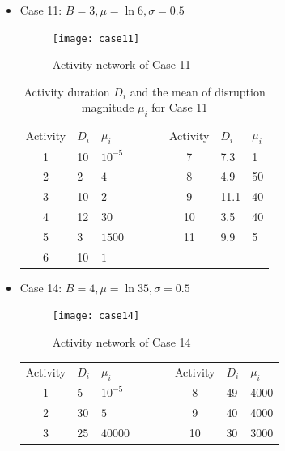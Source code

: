 \documentclass[11pt]{article}
\begin{document}
    \begin{itemize}
        \item Case 11: \(B = 3, \mu = \ln 6, \sigma = 0.5\)
            \begin{figure}[H]
    		    \centering
    		    \texttt{[image: case11]}
    		    \caption{Activity network of Case 11}
    		    \label{fig:case11}
	        \end{figure}
	        \begin{table}[H]
	            \centering		
        		\begin{tabular}{ c | l | l l c| l | l}
        		    \cline{1-3}\cline{5-7}
        			Activity & \(D_{i}\) & \(\mu_i\) & \(\qquad\)& Activity & \(D_{i}\) & \(\mu_i\) \\
        			\cline{1-3}\cline{5-7}
        			1 & 10 & \(10^{-5}\) & & 7 & 7.3 & 1\\ 
        			2 & 2 & \(4\) & & 8 & 4.9 & 50\\ 
        			3 & 10 & \(2\) & & 9 & 11.1 & 40\\ 
        			4 & 12 & \(30\) & & 10 & 3.5 & 40\\ 
        			5 & 3 & \(1500\) & & 11 & 9.9 & 5\\ 
        			6 & 10 & \(1\) & &  &  & \\ 
        			\cline{1-3}\cline{5-7}
        		\end{tabular}
        		\caption{Activity duration \(D_i\) and the mean of disruption magnitude \(\mu_i\) for Case 11}
        		\label{table:case11}
	        \end{table}
	        \pagebreak
        \item Case 14: \(B = 4, \mu = \ln 35, \sigma = 0.5\)
            \begin{figure}[H]
    		    \centering
    		    \texttt{[image: case14]}
    		    \caption{Activity network of Case 14}
    		    \label{fig:case14}
	        \end{figure}
	        \begin{table}[H]
	            \centering		
        		\begin{tabular}{ c | l | l l c| l | l}
        		    \cline{1-3}\cline{5-7}
        			Activity & \(D_{i}\) & \(\mu_i\) & \(\qquad\)& Activity & \(D_{i}\) & \(\mu_i\) \\
        			\cline{1-3}\cline{5-7}
        			1 & 5 & \(10^{-5}\) & & 8 & 49 & 4000\\ 
        			2 & 30 & \(5\) & & 9 & 40 & 4000\\ 
        			3 & 25 & \(40000\) & & 10 & 30 & 3000\\ 

\end{tabular}
\end{table}
\end{itemize}
\end{document}
